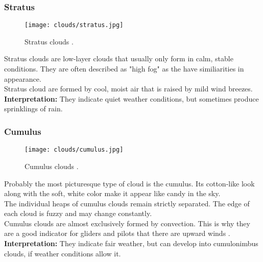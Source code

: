 \subsubsection{Stratus}
\begin{wrapfigure}[9]{r}{6.3cm}
    \vspace{-\baselineskip}
    \texttt{[image: clouds/stratus.jpg]}
    \caption{Stratus clouds \protect\cite{cloudtypes:meteoblue}.}
    \label{img:clouds:stratus}
\end{wrapfigure}
Stratus clouds are low-layer clouds that usually only form in calm, stable conditions.
They are often described as "high fog" as the have similiarities in appearance.
\\
Stratus cloud are formed by cool, moist air that is raised by mild wind breezes.
\emptyline
\textbf{Interpretation:}
They indicate quiet weather conditions, but sometimes produce sprinklings of rain.


\subsubsection{Cumulus}
\begin{wrapfigure}[10]{r}{6.3cm}
    \vspace{-\baselineskip}
    \texttt{[image: clouds/cumulus.jpg]}
    \caption{Cumulus clouds \protect\cite{cloudtypes:meteoblue}.}
    \label{img:clouds:cumulus}
\end{wrapfigure}
Probably the most picturesque type of cloud is the cumulus. 
Its cotton-like look along with the soft, white color make it appear like candy in the sky.
\\
The individual heaps of cumulus clouds remain strictly separated.
The edge of each cloud is fuzzy and may change constantly.
\\
Cumulus clouds are almost exclusively formed by \gls{convection}.
This is why they are a good indicator for gliders and pilots that there are upward winds \protect\cite{cloudtypes:meteoblue}.
\emptyline
\textbf{Interpretation:}
They indicate fair weather, but can develop into cumulonimbus clouds, if weather conditions allow it.


